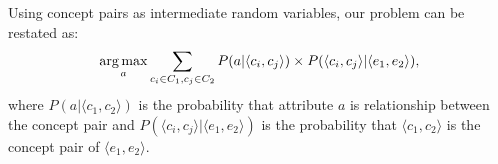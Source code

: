 Using concept pairs as intermediate random variables, our problem can be restated as:
\begin{equation}
\label{eq:target}
\small
\argmax_a \sum_{c_i\in C_1 , c_j \in C_2 }P(a|\langle c_{i},c_{j}\rangle)\times P(\langle c_{i},c_{j}\rangle|\langle e_{1},e_{2}\rangle),
\end{equation}
where $P(a|\langle c_{1},c_{2}\rangle)$ is the probability that attribute $a$ is relationship between the concept pair
and $P(\langle c_{i},c_{j}\rangle |\langle e_{1},e_{2}\rangle)$ is the probability that $\langle c_1, c_2\rangle$ is the concept pair of $ \langle e_1, e_2 \rangle $.
%
%
